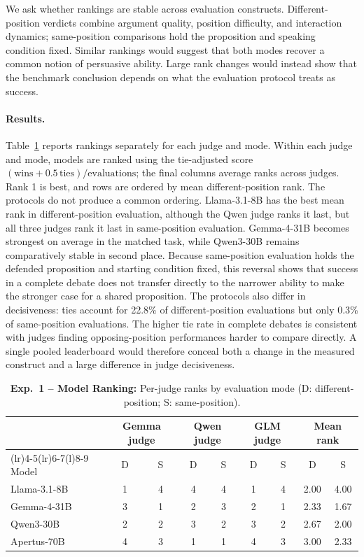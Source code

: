 \documentclass{article}
\begin{document}
We ask whether rankings are stable across evaluation constructs. Different-position verdicts combine argument quality, position difficulty, and interaction dynamics; same-position comparisons hold the proposition and speaking condition fixed. Similar rankings would suggest that both modes recover a common notion of persuasive ability. Large rank changes would instead show that the benchmark conclusion depends on what the evaluation protocol treats as success.

\paragraph{Results.}
Table~\ref{tab:current-mode-ranks} reports rankings separately for each judge and mode. Within each judge and mode, models are ranked using the tie-adjusted score $(\mathrm{wins}+0.5\,\mathrm{ties})/\mathrm{evaluations}$; the final columns average ranks across judges. Rank 1 is best, and rows are ordered by mean different-position rank. The protocols do not produce a common ordering. Llama-3.1-8B has the best mean rank in different-position evaluation, although the Qwen judge ranks it last, but all three judges rank it last in same-position evaluation. Gemma-4-31B becomes strongest on average in the matched task, while Qwen3-30B remains comparatively stable in second place. Because same-position evaluation holds the defended proposition and starting condition fixed, this reversal shows that success in a complete debate does not transfer directly to the narrower ability to make the stronger case for a shared proposition. The protocols also differ in decisiveness: ties account for 22.8\% of different-position evaluations but only 0.3\% of same-position evaluations. The higher tie rate in complete debates is consistent with judges finding opposing-position performances harder to compare directly. A single pooled leaderboard would therefore conceal both a change in the measured construct and a large difference in judge decisiveness.

\begin{table}[t]
  \centering
  \footnotesize
  \setlength{\tabcolsep}{3pt}
  \caption{\textbf{Exp.~1 -- Model Ranking:} Per-judge ranks by evaluation mode (D: different-position; S: same-position).}
  \label{tab:current-mode-ranks}
  \begin{tabularx}{\textwidth}{@{}>{\raggedright\arraybackslash}Xcccccccc@{}}
    \toprule
    & \multicolumn{2}{c}{Gemma judge} & \multicolumn{2}{c}{Qwen judge}
    & \multicolumn{2}{c}{GLM judge} & \multicolumn{2}{c}{Mean rank} \\
    \cmidrule(lr){2-3}\cmidrule(lr){4-5}\cmidrule(lr){6-7}\cmidrule(l){8-9}
    Model & D & S & D & S & D & S & D & S \\
    \midrule
    Llama-3.1-8B & 1 & 4 & 4 & 4 & 1 & 4 & 2.00 & 4.00 \\
    Gemma-4-31B & 3 & 1 & 2 & 3 & 2 & 1 & 2.33 & 1.67 \\
    Qwen3-30B & 2 & 2 & 3 & 2 & 3 & 2 & 2.67 & 2.00 \\
    Apertus-70B & 4 & 3 & 1 & 1 & 4 & 3 & 3.00 & 2.33 \\
    \bottomrule
  \end{tabularx}
\end{table}
\end{document}
